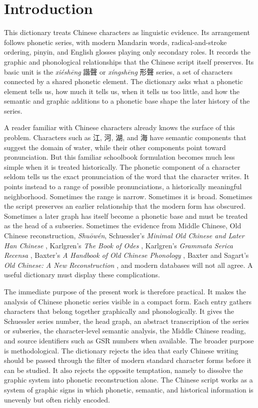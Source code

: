 \section*{Introduction}

This dictionary treats Chinese characters as linguistic evidence. Its arrangement follows phonetic series, with modern Mandarin words, radical-and-stroke ordering, pinyin, and English glosses playing only secondary roles. It records the graphic and phonological relationships that the Chinese script itself preserves. Its basic unit is the \emph{xiéshēng} 諧聲 or \emph{xíngshēng} 形聲 series, a set of characters connected by a shared phonetic element. The dictionary asks what a phonetic element tells us, how much it tells us, when it tells us too little, and how the semantic and graphic additions to a phonetic base shape the later history of the series.

A reader familiar with Chinese characters already knows the surface of this problem. Characters such as 江, 河, 湖, and 海 have semantic components that suggest the domain of water, while their other components point toward pronunciation. But this familiar schoolbook formulation becomes much less simple when it is treated historically. The phonetic component of a character seldom tells us the exact pronunciation of the word that the character writes. It points instead to a range of possible pronunciations, a historically meaningful neighborhood. Sometimes the range is narrow. Sometimes it is broad. Sometimes the script preserves an earlier relationship that the modern form has obscured. Sometimes a later graph has itself become a phonetic base and must be treated as the head of a subseries. Sometimes the evidence from Middle Chinese, Old Chinese reconstruction, \emph{Shuōwén}, Schuessler's \emph{Minimal Old Chinese and Later Han Chinese} \parencite{schuessler-2009}, Karlgren's \emph{The Book of Odes} \parencite{karlgren-1950}, Karlgren's \emph{Grammata Serica Recensa} \parencite{karlgren-1957-gsr}, Baxter's \emph{A Handbook of Old Chinese Phonology} \parencite{baxter-1992}, Baxter and Sagart's \emph{Old Chinese: A New Reconstruction} \parencite{baxter-sagart-2014}, and modern databases will not all agree. A useful dictionary must display these complications.

The immediate purpose of the present work is therefore practical. It makes the analysis of Chinese phonetic series visible in a compact form. Each entry gathers characters that belong together graphically and phonologically. It gives the Schuessler series number, the head graph, an abstract transcription of the series or subseries, the character-level semantic analysis, the Middle Chinese reading, and source identifiers such as GSR numbers when available. The broader purpose is methodological. The dictionary rejects the idea that early Chinese writing should be passed through the filter of modern standard character forms before it can be studied. It also rejects the opposite temptation, namely to dissolve the graphic system into phonetic reconstruction alone. The Chinese script works as a system of graphic signs in which phonetic, semantic, and historical information is unevenly but often richly encoded.

